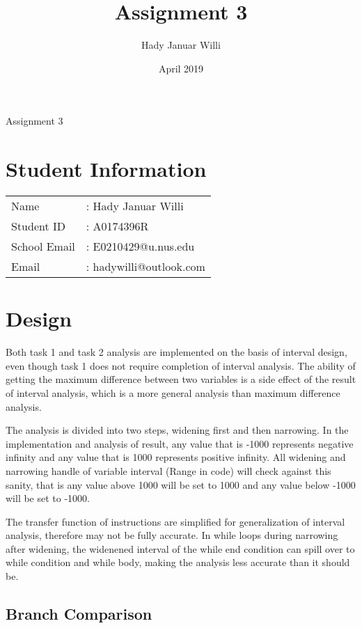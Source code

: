 \documentclass[11pt,a4paper,fleqn]{article}
\title{Assignment 3}
\author{Hady Januar Willi}
\date{April 2019}
\begin{document}
\begin{center}
   \LARGE Assignment 3
\end{center}
\section{Student Information}

\begin{tabular}{l l}
   Name         & : Hady Januar Willi     \\
   Student ID   & : A0174396R             \\
   School Email & : E0210429@u.nus.edu    \\
   Email        & : hadywilli@outlook.com \\
\end{tabular}

\section{Design}

Both task 1 and task 2 analysis are implemented on the basis of interval design, even though task 1 does not require completion of interval analysis.
The ability of getting the maximum difference between two variables is a side effect of the result of interval analysis, which is a more general analysis than maximum difference analysis.

The analysis is divided into two steps, widening first and then narrowing.
In the implementation and analysis of result, any value that is -1000 represents negative infinity and any value that is 1000 represents positive infinity.
All widening and narrowing handle of variable interval (Range in code) will check against this sanity, that is any value above 1000 will be set to 1000 and any value below -1000 will be set to -1000.

The transfer function of instructions are simplified for generalization of interval analysis, therefore may not be fully accurate.
In while loops during narrowing after widening, the widenened interval of the while end condition can spill over to while condition and while body, making the analysis less accurate than it should be.

\subsection{Branch Comparison}
\end{document}
